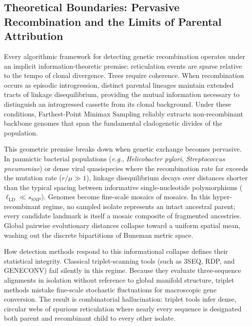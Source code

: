 \subsection{Theoretical Boundaries: Pervasive Recombination and the Limits of Parental Attribution}
\label{subsec:discussion_limits}

Every algorithmic framework for detecting genetic recombination operates under an implicit information-theoretic premise: reticulation events are sparse relative to the tempo of clonal divergence.
Trees require coherence.
When recombination occurs as episodic introgression, distinct parental lineages maintain extended tracts of linkage disequilibrium, providing the mutual information necessary to distinguish an introgressed cassette from its clonal background.
Under these conditions, Farthest-Point Minimax Sampling reliably extracts non-recombinant backbone genomes that span the fundamental cladogenetic divides of the population.

This geometric premise breaks down when genetic exchange becomes pervasive.
In panmictic bacterial populations (\textit{e.g.}, \textit{Helicobacter pylori}, \textit{Streptococcus pneumoniae}) or dense viral quasispecies where the recombination rate far exceeds the mutation rate ($r/\mu \gg 1$), linkage disequilibrium decays over distances shorter than the typical spacing between informative single-nucleotide polymorphisms ($\ell_{\text{LD}} \ll s_{\text{SNP}}$).
Genomes become fine-scale mosaics of mosaics.
In this hyper-recombinant regime, no sampled isolate represents an intact ancestral parent; every candidate landmark is itself a mosaic composite of fragmented ancestries.
Global pairwise evolutionary distances collapse toward a uniform spatial mean, washing out the discrete bipartitions of Buneman metric space.

How detection methods respond to this informational collapse defines their statistical integrity.
Classical triplet-scanning tools (such as 3SEQ, RDP, and GENECONV) fail silently in this regime.
Because they evaluate three-sequence alignments in isolation without reference to global manifold structure, triplet methods mistake fine-scale stochastic fluctuations for macroscopic gene conversion.
The result is combinatorial hallucination: triplet tools infer dense, circular webs of spurious reticulation where nearly every sequence is designated both parent and recombinant child to every other isolate.

